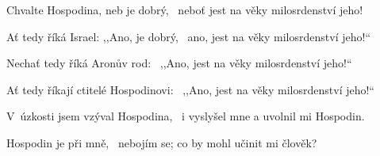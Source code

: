 \begin{psalmus}

Chvalte Hospodina, neb je dobrý,~\grestar{}
neboť jest na věky milosrdenství jeho!~\Abardot{}

Ať tedy říká Israel: ,,Ano, je dobrý,~\grestar{}
ano, jest na věky milosrdenství jeho!\mbox{}``~\Abardot{}

Nechať tedy říká Aronův rod:~\grestar{}
,,Ano, jest na věky milosrdenství jeho!``~\Abardot{}

Ať tedy říkají ctitelé Hospodinovi:~\grestar{}
,,Ano, jest na věky milosrdenství jeho!``~\Abardot{}

V úzkosti jsem vzýval Hospodina,~\grestar{}
i vyslyšel mne a uvolnil mi Hospodin.~\Abardot{}

Hospodin je při mně,~\grestar{}
nebojím se; co by mohl učinit mi člověk?~\Abardot{}
\end{psalmus}
